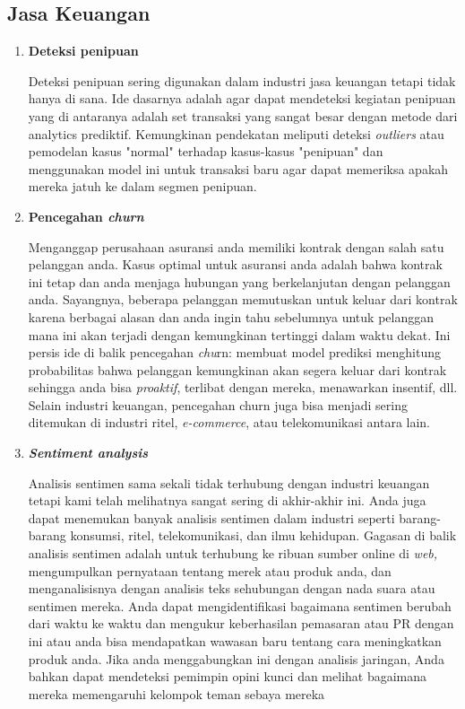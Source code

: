 \subsection{Jasa Keuangan}
\begin{enumerate}
    \item \textbf{Deteksi penipuan}
    \par Deteksi penipuan sering digunakan dalam industri jasa keuangan tetapi tidak hanya di sana. Ide dasarnya adalah agar dapat mendeteksi kegiatan penipuan yang di antaranya adalah set transaksi yang sangat besar dengan metode dari analytics prediktif. Kemungkinan pendekatan meliputi deteksi \textit{outliers} atau pemodelan kasus "normal" terhadap kasus-kasus "penipuan" dan menggunakan model ini untuk transaksi baru agar dapat memeriksa apakah mereka jatuh ke dalam segmen penipuan.
    \item \textbf{Pencegahan \textit{churn}}
    
\par Menganggap perusahaan asuransi anda memiliki kontrak dengan salah satu pelanggan anda. Kasus optimal untuk asuransi anda adalah bahwa kontrak ini tetap dan anda menjaga hubungan yang berkelanjutan dengan pelanggan anda. Sayangnya, beberapa pelanggan memutuskan untuk keluar dari kontrak karena berbagai alasan dan anda ingin tahu sebelumnya untuk pelanggan mana ini akan terjadi dengan kemungkinan tertinggi dalam waktu dekat. Ini persis ide di balik pencegahan\textit{ chu}rn: membuat model prediksi menghitung probabilitas bahwa pelanggan kemungkinan akan segera keluar dari kontrak sehingga anda bisa \textit{proaktif}, terlibat dengan mereka, menawarkan insentif, dll. Selain industri keuangan, pencegahan churn juga bisa menjadi sering ditemukan di industri ritel, \textit{e-commerce}, atau telekomunikasi antara lain.

\item \textbf{\textit{Sentiment analysis}}
\par Analisis sentimen sama sekali tidak terhubung dengan industri keuangan tetapi kami telah melihatnya sangat sering di akhir-akhir ini. Anda juga dapat menemukan banyak analisis sentimen dalam industri seperti barang-barang konsumsi, ritel, telekomunikasi, dan ilmu kehidupan. Gagasan di balik analisis sentimen adalah untuk terhubung ke ribuan sumber online di \textit{web,} mengumpulkan pernyataan tentang merek atau produk anda, dan menganalisisnya dengan analisis teks sehubungan dengan nada suara atau sentimen mereka. Anda dapat mengidentifikasi bagaimana sentimen berubah dari waktu ke waktu dan mengukur keberhasilan pemasaran atau PR dengan ini atau anda bisa mendapatkan wawasan baru tentang cara meningkatkan produk anda. Jika anda menggabungkan ini dengan analisis jaringan, Anda bahkan dapat mendeteksi pemimpin opini kunci dan melihat bagaimana mereka memengaruhi kelompok teman sebaya mereka


\end{enumerate}
